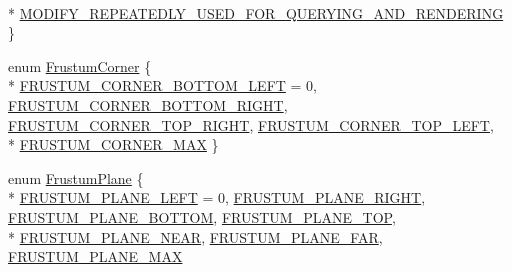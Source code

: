 \begin{DoxyCompactItemize}
\\*
\hyperlink{namespacekglt_a964a917aefb575ce817a16ccb32579f3a8af6de78a225209c1efc7ab20874a9f9}{M\-O\-D\-I\-F\-Y\-\_\-\-R\-E\-P\-E\-A\-T\-E\-D\-L\-Y\-\_\-\-U\-S\-E\-D\-\_\-\-F\-O\-R\-\_\-\-Q\-U\-E\-R\-Y\-I\-N\-G\-\_\-\-A\-N\-D\-\_\-\-R\-E\-N\-D\-E\-R\-I\-N\-G}
 \}
\item 
enum \hyperlink{namespacekglt_aa38869135245a5fada16dd67cae4cbc8}{Frustum\-Corner} \{ \\*
\hyperlink{namespacekglt_aa38869135245a5fada16dd67cae4cbc8a04cec1c18ae4b5a4b3c86a85160794aa}{F\-R\-U\-S\-T\-U\-M\-\_\-\-C\-O\-R\-N\-E\-R\-\_\-\-B\-O\-T\-T\-O\-M\-\_\-\-L\-E\-F\-T} =  0, 
\hyperlink{namespacekglt_aa38869135245a5fada16dd67cae4cbc8a01b3d7fa5728734feddadc6feac6575d}{F\-R\-U\-S\-T\-U\-M\-\_\-\-C\-O\-R\-N\-E\-R\-\_\-\-B\-O\-T\-T\-O\-M\-\_\-\-R\-I\-G\-H\-T}, 
\hyperlink{namespacekglt_aa38869135245a5fada16dd67cae4cbc8acb844e7fa341fe395de6e3dcaf9d8906}{F\-R\-U\-S\-T\-U\-M\-\_\-\-C\-O\-R\-N\-E\-R\-\_\-\-T\-O\-P\-\_\-\-R\-I\-G\-H\-T}, 
\hyperlink{namespacekglt_aa38869135245a5fada16dd67cae4cbc8a5144932868787d12f3996c0b7fbc9d1f}{F\-R\-U\-S\-T\-U\-M\-\_\-\-C\-O\-R\-N\-E\-R\-\_\-\-T\-O\-P\-\_\-\-L\-E\-F\-T}, 
\\*
\hyperlink{namespacekglt_aa38869135245a5fada16dd67cae4cbc8a6af1f4b5b7d5d80a994cdf5da04a5914}{F\-R\-U\-S\-T\-U\-M\-\_\-\-C\-O\-R\-N\-E\-R\-\_\-\-M\-A\-X}
 \}
\item 
enum \hyperlink{namespacekglt_a665b086b85bc84e4266872b47a5d7d1b}{Frustum\-Plane} \{ \\*
\hyperlink{namespacekglt_a665b086b85bc84e4266872b47a5d7d1ba36753ac1222a525da8d1358edca28739}{F\-R\-U\-S\-T\-U\-M\-\_\-\-P\-L\-A\-N\-E\-\_\-\-L\-E\-F\-T} =  0, 
\hyperlink{namespacekglt_a665b086b85bc84e4266872b47a5d7d1bac2851d135e8c018e872110bd5c93d765}{F\-R\-U\-S\-T\-U\-M\-\_\-\-P\-L\-A\-N\-E\-\_\-\-R\-I\-G\-H\-T}, 
\hyperlink{namespacekglt_a665b086b85bc84e4266872b47a5d7d1badca53e3bc2efbf5acf207a6b4bc801cf}{F\-R\-U\-S\-T\-U\-M\-\_\-\-P\-L\-A\-N\-E\-\_\-\-B\-O\-T\-T\-O\-M}, 
\hyperlink{namespacekglt_a665b086b85bc84e4266872b47a5d7d1ba7e39ab7d76737056a0ddc686444609ec}{F\-R\-U\-S\-T\-U\-M\-\_\-\-P\-L\-A\-N\-E\-\_\-\-T\-O\-P}, 
\\*
\hyperlink{namespacekglt_a665b086b85bc84e4266872b47a5d7d1ba504ff2372bf27476d5384681669cf67e}{F\-R\-U\-S\-T\-U\-M\-\_\-\-P\-L\-A\-N\-E\-\_\-\-N\-E\-A\-R}, 
\hyperlink{namespacekglt_a665b086b85bc84e4266872b47a5d7d1ba788add92e98fb8a323043e6db84ca384}{F\-R\-U\-S\-T\-U\-M\-\_\-\-P\-L\-A\-N\-E\-\_\-\-F\-A\-R}, 
\hyperlink{namespacekglt_a665b086b85bc84e4266872b47a5d7d1ba3fc3da8c05e20b1649242ca1e20f86fb}{F\-R\-U\-S\-T\-U\-M\-\_\-\-P\-L\-A\-N\-E\-\_\-\-M\-A\-X}

\end{DoxyCompactItemize}
